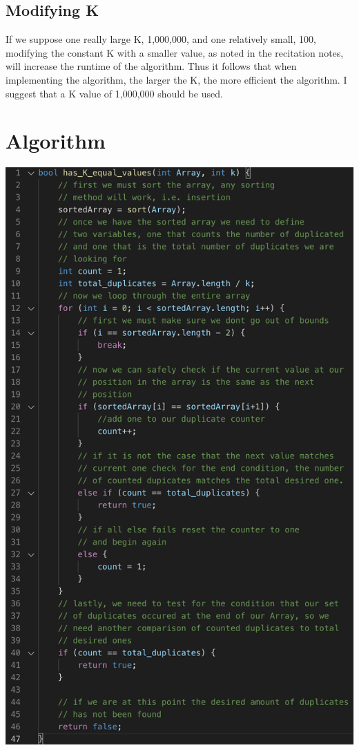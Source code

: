 \documentclass[12pt]{article}
\begin{document}
\subsection{Modifying K}

If we suppose one really large K, 1,000,000, and one relatively small, 100, modifying the constant K with a smaller value, as noted in the recitation notes, will increase the runtime of the algorithm. Thus it follows that when implementing the algorithm, the larger the K, the more efficient the algorithm. I suggest that a K value of 1,000,000 should be used.


\pagebreak

\section{Algorithm}

\includegraphics[scale=0.74]{algo}
\end{document}

